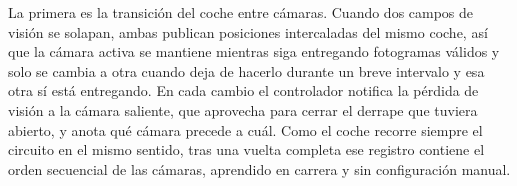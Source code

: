 La primera es la transición del coche entre cámaras. Cuando dos campos de visión se solapan, ambas publican posiciones intercaladas del mismo coche, así que la cámara activa se mantiene mientras siga entregando fotogramas válidos y solo se cambia a otra cuando deja de hacerlo durante un breve intervalo y esa otra sí está entregando. En cada cambio el controlador notifica la pérdida de visión a la cámara saliente, que aprovecha para cerrar el derrape que tuviera abierto, y anota qué cámara precede a cuál. Como el coche recorre siempre el circuito en el mismo sentido, tras una vuelta completa ese registro contiene el orden secuencial de las cámaras, aprendido en carrera y sin configuración manual.


